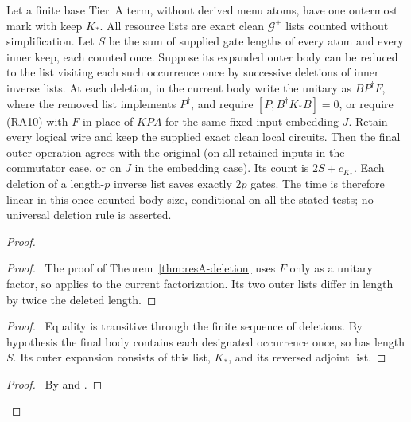\begin{corollary}
\label{cor:resA-flat}
Let a finite base Tier~A term, without derived menu atoms, have one
outermost mark with keep $K_*$. All resource lists are exact clean
$\mathcal G^{\pm}$ lists counted without simplification.
Let $S$ be the sum of supplied gate lengths of every atom and every
inner keep, each counted once. Suppose its expanded outer body can
be reduced to the list visiting each such occurrence once by successive
deletions of inner inverse lists. At each deletion, in the current
body write the unitary as $BP^\dagger F$, where the removed list
implements $P^\dagger$, and require
$[P,B^\dagger K_*B]=0$, or require (RA10) with $F$ in place of $KPA$
for the same fixed input embedding $J$. Retain every logical wire and
keep the supplied exact clean local circuits. Then the final outer
operation agrees with the original (on all retained inputs in the
commutator case, or on $J$ in the embedding case). Its count is
$2S+c_{K_*}$. Each deletion of a length-$p$ inverse list saves exactly
$2p$ gates. The time is therefore linear in this once-counted body size,
conditional on all the stated tests; no universal deletion rule is asserted.
\end{corollary}
\begin{proof}
 \begin{proof}\pf\ The proof of Theorem~\ref{thm:resA-deletion}
 uses $F$ only as a unitary factor, so applies to the current factorization.
 Its two outer lists differ in length by twice the deleted length.
 \end{proof}
 \begin{proof}\pf\ Equality is transitive through the finite
 sequence of deletions. By hypothesis the final body contains each
 designated occurrence once, so has length $S$. Its outer expansion
 consists of this list, $K_*$, and its reversed adjoint list.\end{proof}
 \qedstep
 \begin{proof}\pf\ By  and .
 \end{proof}
\end{proof}

